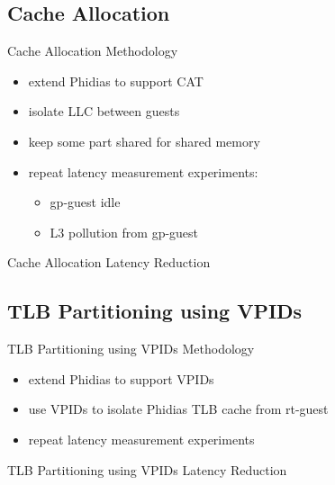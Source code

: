 \documentclass[10pt,hyperref={hyperfootnotes=false}, xcolor={usenames, dvipsnames}]{beamer}
\begin{document}
\subsection{Cache Allocation}
\begin{frame}{Cache Allocation} {Methodology}
   \begin{itemize}
   \item {extend Phidias to support CAT} \pause {}
   \item {isolate LLC between guests} \pause {}
	    \begingroup
		 
		\endgroup		
		\pause
   \item {keep some part shared for shared memory} \pause {}
   \item {repeat latency measurement experiments:}
		  \begin{itemize}
				\item {gp-guest idle}
				\item {L3 pollution from gp-guest}
		  \end{itemize}
  \end{itemize}
\end{frame}

\begin{frame}[allowframebreaks]{Cache Allocation} {Latency Reduction}
	
\end{frame}

\subsection{TLB Partitioning using VPIDs}
\begin{frame}{TLB Partitioning using VPIDs} {Methodology}
   \begin{itemize}
     \item {extend Phidias to support VPIDs} \pause {}
     \item {use VPIDs to isolate Phidias TLB cache from rt-guest} \pause {}
  	 \item {repeat latency measurement experiments}
  \end{itemize}
\end{frame}

\begin{frame}[allowframebreaks]{TLB Partitioning using VPIDs} {Latency Reduction}
	
\end{frame}
\end{document}
